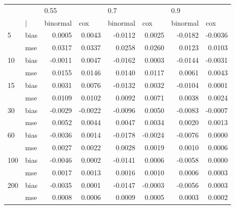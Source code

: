 \begin{table}[ht]
\centering
\begin{tabular}{ll rrrrrr}
  \toprule
     &            & \multicolumn{1}{l}{     0.55} & \multicolumn{1}{l}{        } & \multicolumn{1}{l}{      0.7} & \multicolumn{1}{l}{        } & \multicolumn{1}{l}{      0.9} & \multicolumn{1}{l}{        } \\ 
      &  $\vert$  & \multicolumn{1}{l}{ binormal} & \multicolumn{1}{l}{     cox} & \multicolumn{1}{l}{ binormal} & \multicolumn{1}{l}{     cox} & \multicolumn{1}{l}{ binormal} & \multicolumn{1}{l}{     cox} \\ 
   \midrule
5   & bias       &   0.0005 &  0.0043 &  -0.0112 &  0.0025 &  -0.0182 & -0.0036 \\ 
      & mse        &   0.0317 &  0.0337 &   0.0258 &  0.0260 &   0.0123 &  0.0103 \\ 
  10  & bias       &  -0.0011 &  0.0047 &  -0.0162 &  0.0003 &  -0.0144 & -0.0031 \\ 
      & mse        &   0.0155 &  0.0146 &   0.0140 &  0.0117 &   0.0061 &  0.0043 \\ 
  15  & bias       &   0.0031 &  0.0076 &  -0.0132 &  0.0032 &  -0.0104 &  0.0001 \\ 
      & mse        &   0.0109 &  0.0102 &   0.0092 &  0.0071 &   0.0038 &  0.0024 \\ 
  30  & bias       &  -0.0029 & -0.0022 &  -0.0096 &  0.0050 &  -0.0083 & -0.0007 \\ 
      & mse        &   0.0052 &  0.0044 &   0.0047 &  0.0034 &   0.0020 &  0.0013 \\ 
  60  & bias       &  -0.0036 &  0.0014 &  -0.0178 & -0.0024 &  -0.0076 &  0.0000 \\ 
      & mse        &   0.0027 &  0.0022 &   0.0028 &  0.0019 &   0.0010 &  0.0006 \\ 
  100 & bias       &  -0.0046 &  0.0002 &  -0.0141 &  0.0006 &  -0.0058 &  0.0000 \\ 
      & mse        &   0.0017 &  0.0013 &   0.0016 &  0.0010 &   0.0006 &  0.0003 \\ 
  200 & bias       &  -0.0035 &  0.0001 &  -0.0147 & -0.0003 &  -0.0056 &  0.0003 \\ 
      & mse        &   0.0008 &  0.0006 &   0.0009 &  0.0005 &   0.0003 &  0.0002 \\ 
   \bottomrule
\end{tabular}
\end{table}

